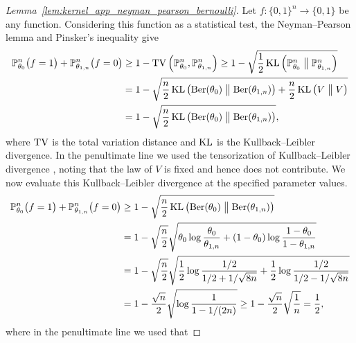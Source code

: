 \begin{proof}[Lemma~\ref{lem:kernel_app_neyman_pearson_bernoulli}]

  Let $f: \{0,1\}^n \to \{0,1\}$
  be any function.
  Considering this function as a statistical test,
  the Neyman--Pearson lemma and Pinsker's inequality
  \citep{gine2021mathematical}
  give
  \begin{align*}
    \mathbb{P}_{\theta_0}^n \big(
      f=1
    \big)
    +\mathbb{P}_{\theta_{1,n}}^n \big(
      f=0
    \big)
    &\geq
    1-
    \mathrm{TV}\left(
      \mathbb{P}_{\theta_0}^n,
      \mathbb{P}_{\theta_{1,n}}^n
    \right)
    \geq
    1-
    \sqrt{
      \frac{1}{2}
      \operatorname{KL} \left(
        \mathbb{P}_{\theta_0}^n
        \bigm\|
        \mathbb{P}_{\theta_{1,n}}^n
    \right)} \\
    &=
    1-
    \sqrt{
      \frac{n}{2}
      \operatorname{KL} \left(
        \operatorname{Ber}(\theta_0)
        \bigm\|
        \operatorname{Ber}(\theta_{1,n})
      \right)
      + \frac{n}{2}
      \operatorname{KL} \left(
        V
        \bigm\|
        V
    \right)} \\
    &=
    1-
    \sqrt{
      \frac{n}{2}
      \operatorname{KL} \left(
        \operatorname{Ber}(\theta_0)
        \bigm\|
        \operatorname{Ber}(\theta_{1,n})
    \right)},
  \end{align*}
  where $\mathrm{TV}$ is the total variation distance
  and $\operatorname{KL}$ is the Kullback--Leibler divergence.
  In the penultimate line
  we used the tensorization of Kullback--Leibler divergence
  \citep{gine2021mathematical},
  noting that the law of $V$ is fixed and hence does not contribute.
  We now evaluate this Kullback--Leibler divergence at the specified
  parameter values.
  \begin{align*}
    \mathbb{P}_{\theta_0}^n \big(
      f=1
    \big)
    +\mathbb{P}_{\theta_{1,n}}^n \big(
      f=0
    \big)
    &\geq
    1-
    \sqrt{
      \frac{n}{2}
      \operatorname{KL} \left(
        \operatorname{Ber}(\theta_0)
        \bigm\|
        \operatorname{Ber}(\theta_{1,n})
    \right)} \\
    &=
    1-
    \sqrt{\frac{n}{2}}
    \sqrt{
      \theta_0 \log \frac{\theta_0}{\theta_{1,n}}
    + (1 - \theta_0) \log \frac{1 - \theta_0}{1 - \theta_{1,n}}} \\
    &=
    1-
    \sqrt{\frac{n}{2}}
    \sqrt{
      \frac{1}{2} \log \frac{1/2}{1/2 + 1/\sqrt{8n}}
    + \frac{1}{2} \log \frac{1/2}{1/2 - 1/\sqrt{8n}}} \\
    &=
    1-
    \frac{\sqrt n}{2}
    \sqrt{\log \frac{1}{1 - 1/(2n)}}
    \geq
    1-
    \frac{\sqrt n}{2}
    \sqrt{\frac{1}{n}}
    =
    \frac{1}{2},
  \end{align*}
  where in the penultimate line we used that

\end{proof}
